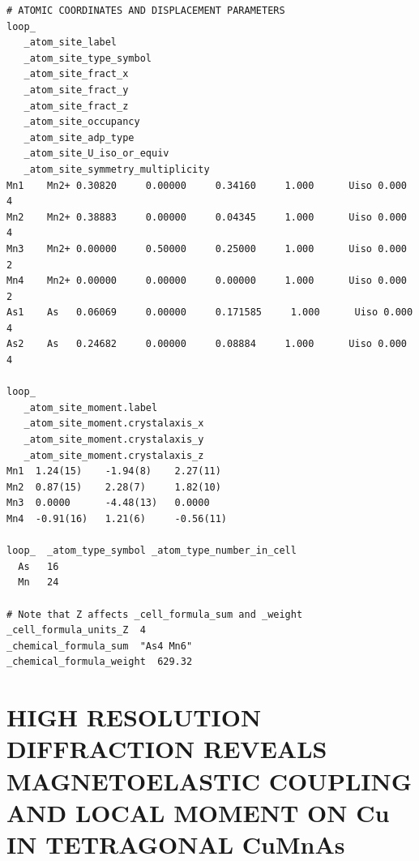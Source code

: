 \documentclass[10pt,doublespacing,edeposit]{uiucthesis2020}
\begin{document}
\begin{mainmatter}
\begin{verbatim}
# ATOMIC COORDINATES AND DISPLACEMENT PARAMETERS
loop_ 
   _atom_site_label
   _atom_site_type_symbol
   _atom_site_fract_x
   _atom_site_fract_y
   _atom_site_fract_z
   _atom_site_occupancy
   _atom_site_adp_type
   _atom_site_U_iso_or_equiv
   _atom_site_symmetry_multiplicity
Mn1    Mn2+ 0.30820     0.00000     0.34160     1.000      Uiso 0.000      4   
Mn2    Mn2+ 0.38883     0.00000     0.04345     1.000      Uiso 0.000      4   
Mn3    Mn2+ 0.00000     0.50000     0.25000     1.000      Uiso 0.000      2   
Mn4    Mn2+ 0.00000     0.00000     0.00000     1.000      Uiso 0.000      2   
As1    As   0.06069     0.00000     0.171585     1.000      Uiso 0.000      4   
As2    As   0.24682     0.00000     0.08884     1.000      Uiso 0.000      4   

loop_
   _atom_site_moment.label
   _atom_site_moment.crystalaxis_x
   _atom_site_moment.crystalaxis_y
   _atom_site_moment.crystalaxis_z
Mn1  1.24(15)    -1.94(8)    2.27(11)    
Mn2  0.87(15)    2.28(7)     1.82(10)    
Mn3  0.0000      -4.48(13)   0.0000      
Mn4  -0.91(16)   1.21(6)     -0.56(11)   

loop_  _atom_type_symbol _atom_type_number_in_cell
  As   16
  Mn   24

# Note that Z affects _cell_formula_sum and _weight
_cell_formula_units_Z  4
_chemical_formula_sum  "As4 Mn6"
_chemical_formula_weight  629.32
\end{verbatim}

\chapter{HIGH RESOLUTION DIFFRACTION REVEALS MAGNETOELASTIC COUPLING AND LOCAL MOMENT ON Cu IN TETRAGONAL CuMnAs}

\vspace{15mm}


\end{mainmatter}
\end{document}
